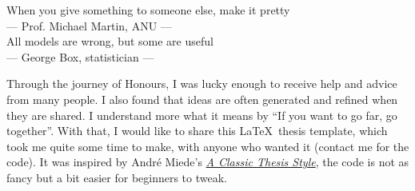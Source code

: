 \thispagestyle{empty}

\vspace*{3cm}
\normalsize
\begin{center}
When you give something to someone else, make it pretty \\ \medskip
--- Prof. Michael Martin, ANU --- \\  
\vspace{1cm}
All models are wrong, but some are useful \\ \medskip
--- George Box, statistician ---
\end{center}

\vspace{2cm}

Through the journey of Honours, I was lucky enough to receive help and advice from many people. I also found that ideas are often generated and refined when they are shared. I understand more what it means by ``If you want to go far, go together''. With that, I would like to share this \LaTeX\ thesis template, which took me quite some time to make, with anyone who wanted it (contact me for the code). It was inspired by André Miede's \href{https://bitbucket.org/amiede/classicthesis/wiki/Home}{\textit{A Classic Thesis Style}}, the code is not as fancy but a bit easier for beginners to tweak.